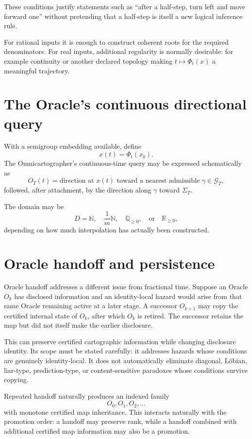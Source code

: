 \documentclass[11pt]{article}
\newcommand{\Rge}{\mathbb{R}_{\ge 0}}
\newcommand{\Qge}{\mathbb{Q}_{\ge 0}}
\newcommand{\N}{\mathbb{N}}
\begin{document}
These conditions justify statements such as ``after a half-step, turn left and move forward one'' without pretending that a half-step is itself a new logical inference rule.

For rational inputs it is enough to construct coherent roots for the required denominators. For real inputs, additional regularity is normally desirable: for example continuity or another declared topology making $t\mapsto\Phi_t(x)$ a meaningful trajectory.

\section{The Oracle's continuous directional query}
With a semigroup embedding available, define
\[
x(t)=\Phi_t(x_0).
\]
The Omnicartographer's continuous-time query may be expressed schematically as
\[
O_T(t)=\text{direction at }x(t)\text{ toward a nearest admissible }\gamma\in\mathcal G_T,
\]
followed, after attachment, by the direction along $\gamma$ toward $\Sigma_T$.

The domain may be
\[
D=\N,\quad \frac{1}{m}\N,\quad \Qge,\quad\text{or}\quad\Rge,
\]
depending on how much interpolation has actually been constructed.

\section{Oracle handoff and persistence}
Oracle handoff addresses a different issue from fractional time. Suppose an Oracle $O_k$ has disclosed information and an identity-local hazard would arise from that same Oracle remaining active at a later stage. A successor $O_{k+1}$ may copy the certified internal state of $O_k$, after which $O_k$ is retired. The successor retains the map but did not itself make the earlier disclosure.

This can preserve certified cartographic information while changing disclosure identity. Its scope must be stated carefully: it addresses hazards whose conditions are genuinely identity-local. It does not automatically eliminate diagonal, L\"obian, liar-type, prediction-type, or content-sensitive paradoxes whose conditions survive copying.

Repeated handoff naturally produces an indexed family
\[
O_0,O_1,O_2,\ldots
\]
with monotone certified map inheritance. This interacts naturally with the promotion order: a handoff may preserve rank, while a handoff combined with additional certified map information may also be a promotion.
\end{document}
